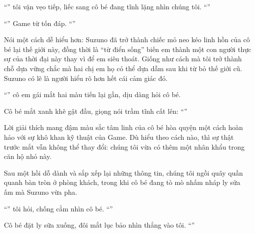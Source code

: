 \documentclass[../main.tex]{subfiles}
\begin{document}
``'' tôi vặn vẹo tiếp, liếc sang cô bé đang tĩnh lặng nhìn chúng tôi. ``''

``'' Game từ tốn đáp. ``''

Nói một cách dễ hiểu hơn: Suzuno đã trở thành chiếc mỏ neo kéo linh hồn của cô bé lại thế giới này, đồng thời là ``từ điển sống'' biến em thành một con người thực sự của thời đại này thay vì để em siêu thoát. Giống như cách mà tôi trở thành chỗ dựa vững chắc mà hai chị em họ có thể dựa dẫm sau khi từ bỏ thế giới cũ. Suzuno có lẽ là người hiểu rõ hơn hết cái cảm giác đó.

``'' cô em gái mắt hai màu tiến lại gần, dịu dàng hỏi cô bé.

Cô bé mắt xanh khẽ gật đầu, giọng nói trầm tĩnh cất lên: ``''

Lời giải thích mang đậm màu sắc tâm linh của cô bé hòa quyện một cách hoàn hảo với sự khô khan kỹ thuật của Game. Dù hiểu theo cách nào, thì sự thật trước mắt vẫn không thể thay đổi: chúng tôi vừa có thêm một nhân khẩu trong căn hộ nhỏ này.

\ct

Sau một hồi dỗ dành và sắp xếp lại những thông tin, chúng tôi ngồi quây quần quanh bàn tròn ở phòng khách, trong khi cô bé đang tò mò nhấm nháp ly sữa ấm mà Suzuno vừa pha.

``'' tôi hỏi, chống cằm nhìn cô bé. ``''

Cô bé đặt ly sữa xuống, đôi mắt lục bảo nhìn thẳng vào tôi. ``''
\end{document}
